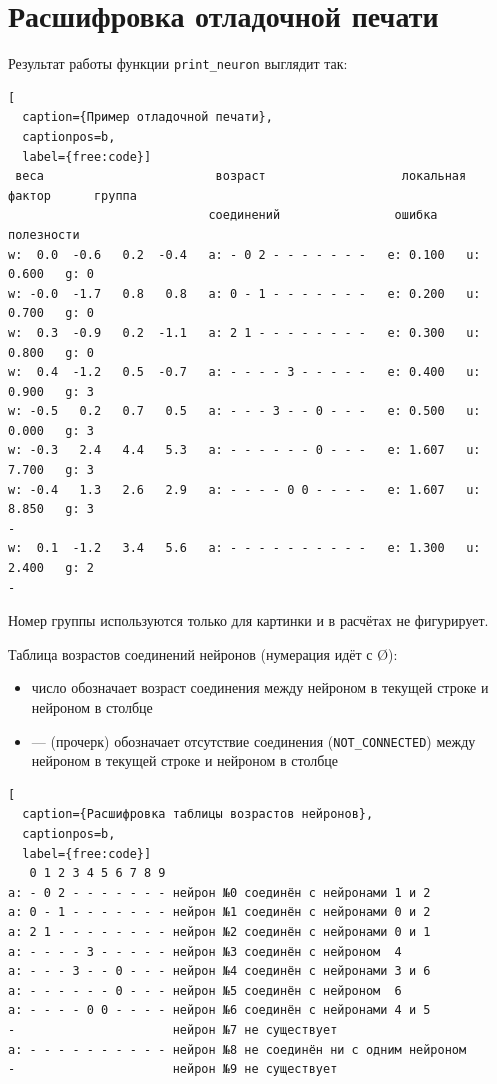 \documentclass[unicode, 12pt, a4paper,oneside,fleqn]{article}
\begin{document}
\clearpage
\section{Расшифровка отладочной печати}
Результат работы функции \verb'print_neuron' выглядит так:

\begin{lstlisting}[
  caption={Пример отладочной печати},
  captionpos=b,
  label={free:code}]
 веса                        возраст                   локальная   фактор      группа
                            соединений                ошибка      полезности
w:  0.0  -0.6   0.2  -0.4   a: - 0 2 - - - - - - -   e: 0.100   u: 0.600   g: 0
w: -0.0  -1.7   0.8   0.8   a: 0 - 1 - - - - - - -   e: 0.200   u: 0.700   g: 0
w:  0.3  -0.9   0.2  -1.1   a: 2 1 - - - - - - - -   e: 0.300   u: 0.800   g: 0
w:  0.4  -1.2   0.5  -0.7   a: - - - - 3 - - - - -   e: 0.400   u: 0.900   g: 3
w: -0.5   0.2   0.7   0.5   a: - - - 3 - - 0 - - -   e: 0.500   u: 0.000   g: 3
w: -0.3   2.4   4.4   5.3   a: - - - - - - 0 - - -   e: 1.607   u: 7.700   g: 3
w: -0.4   1.3   2.6   2.9   a: - - - - 0 0 - - - -   e: 1.607   u: 8.850   g: 3
-
w:  0.1  -1.2   3.4   5.6   a: - - - - - - - - - -   e: 1.300   u: 2.400   g: 2
-
\end{lstlisting}

Номер группы используются только для картинки и в расчётах не фигурирует.


Таблица возрастов соединений нейронов (нумерация идёт с \O):
\begin{itemize}
\item число обозначает возраст соединения между нейроном в текущей
  строке и нейроном в столбце
\item --- (прочерк) обозначает отсутствие соединения
  (\verb'NOT_CONNECTED') между нейроном в текущей строке и нейроном в
  столбце
\end{itemize}
\begin{lstlisting}[
  caption={Расшифровка таблицы возрастов нейронов},
  captionpos=b,
  label={free:code}]
   0 1 2 3 4 5 6 7 8 9
a: - 0 2 - - - - - - - нейрон №0 соединён с нейронами 1 и 2
a: 0 - 1 - - - - - - - нейрон №1 соединён с нейронами 0 и 2
a: 2 1 - - - - - - - - нейрон №2 соединён с нейронами 0 и 1
a: - - - - 3 - - - - - нейрон №3 соединён с нейроном  4
a: - - - 3 - - 0 - - - нейрон №4 соединён с нейронами 3 и 6
a: - - - - - - 0 - - - нейрон №5 соединён с нейроном  6
a: - - - - 0 0 - - - - нейрон №6 соединён с нейронами 4 и 5
-                      нейрон №7 не существует
a: - - - - - - - - - - нейрон №8 не соединён ни с одним нейроном
-                      нейрон №9 не существует
\end{lstlisting}
\end{document}

